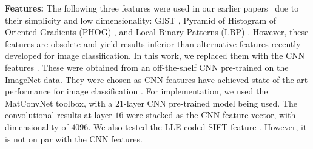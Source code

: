 









\textbf{Features:} The following three features were used in our
earlier papers~\citep{dai:eccv12b, dai:iccv13b} due to their simplicity and low dimensionality: GIST
\citep{gist}, Pyramid of Histogram of Oriented Gradients (PHOG)
\citep{phog}, and Local Binary Patterns (LBP)
\citep{lbp}. However, these features are obsolete and yield
 results inferior than alternative features recently developed  for image
classification. 
In this work, we replaced them with the CNN features \citep{decaf, deep:bmvc14}. 
These were obtained from an off-the-shelf CNN pre-trained on the ImageNet data. 
They were chosen as CNN features
have achieved state-of-the-art performance for image classification
\citep{deepnet:nips12, cnnfet14}. For implementation, we used the
MatConvNet \citep{MatConvNet} toolbox, with a $21$-layer CNN
pre-trained model being used. The convolutional results at layer $16$ were
stacked as the CNN feature vector, with dimensionality of $4096$.  We
also tested the LLE-coded SIFT feature \citep{siftllc:cvpr10}. However,
it is not on par with the CNN features.
 
